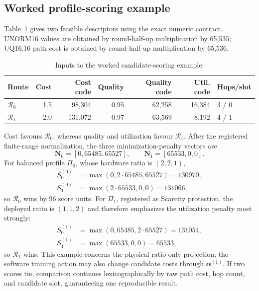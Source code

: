 \subsection{Worked profile-scoring example}

Table~\ref{tab:worked-score-inputs} gives two feasible descriptors using the exact
numeric contract. UNORM16 values are obtained by round-half-up multiplication by
65,535; UQ16.16 path cost is obtained by round-half-up multiplication by 65,536.

\begin{table}[H]
\centering
\caption{Inputs to the worked candidate-scoring example.}
\label{tab:worked-score-inputs}
\begin{tabularx}{\textwidth}{@{}lrrrrrX@{}}
\toprule
\textbf{Route} & \textbf{Cost} & \textbf{Cost code} & \textbf{Quality} &
\textbf{Quality code} & \textbf{Util. code} & \textbf{Hops/slot}\\
\midrule
$\mathcal R_0$ & 1.5 & 98,304 & 0.95 & 62,258 & 16,384 & 3 / 0\\
$\mathcal R_1$ & 2.0 & 131,072 & 0.97 & 63,569 & 8,192 & 4 / 1\\
\bottomrule
\end{tabularx}
\end{table}

Cost favours $\mathcal R_0$, whereas quality and utilization favour $\mathcal R_1$.
After the registered finite-range normalization, the three minimization-penalty
vectors are
\begin{equation}
\boldsymbol N_0=[0,65485,65527],\qquad
\boldsymbol N_1=[65533,0,0].
\label{eq:worked-normalized-vectors}
\end{equation}
For balanced profile $\Pi_0$, whose hardware ratio is $(2,2,1)$,
\begin{align}
S_0^{(0)}&=\max(0,2\cdot65485,65527)=130970,\\
S_1^{(0)}&=\max(2\cdot65533,0,0)=131066,
\end{align}
so $\mathcal R_0$ wins by 96 score units. For $\Pi_1$, registered as Scarcity
protection, the deployed ratio is $(1,1,2)$ and therefore emphasizes the utilization
penalty most strongly:
\begin{align}
S_0^{(1)}&=\max(0,65485,2\cdot65527)=131054,\\
S_1^{(1)}&=\max(65533,0,0)=65533,
\end{align}
so $\mathcal R_1$ wins. This example concerns the physical ratio-only projection;
the software training action may also change candidate costs through
$\boldsymbol\alpha^{(1)}$. If two scores tie, comparison continues lexicographically
by raw path cost, hop count, and candidate slot, guaranteeing one reproducible
result.


